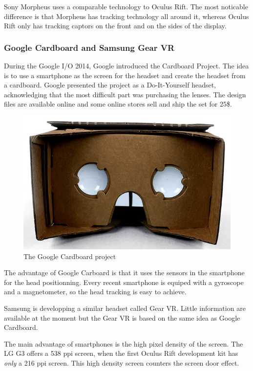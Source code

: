 \documentclass[12pt]{article}
\begin{document}
Sony Morpheus uses a comparable technology to Oculus Rift. The most noticable difference is that Morpheus has tracking technology all around it, whereas Oculus Rift only has tracking captors on the front and on the sides of the display.

\subsubsection{Google Cardboard and Samsung Gear VR}
During the Google I/O 2014, Google introduced the Cardboard Project. The idea is to use a smartphone as the screen for the headset and create the headset from a cardboard. Google presented the project as a Do-It-Yourself headset, acknowledging that the most difficult part was purchasing the lenses. The design files are available online and some online stores sell and ship the set for 25\$.

\begin{figure}[h]
  \centering
  \includegraphics[scale=0.3]{GoogleCardboard.png}
  \caption{\label{fig:cardboard} The Google Cardboard project}
\end{figure}

The advantage of Google Carboard is that it uses the sensors in the smartphone for the head positionning. Every recent smartphone is equiped with a gyroscope and a magnetometer, so the head tracking is easy to achieve.

Samsung is developping a similar headset called Gear VR. Little information are available at the moment but the Gear VR is based on the same idea as Google Cardboard.

The main advantage of smartphones is the high pixel density of the screen. The LG G3 offers a 538 ppi screen, when the first Oculus Rift development kit has \textit{only} a 216 ppi screen. This high density screen counters the screen door effect.
\end{document}

